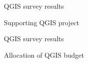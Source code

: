 \begin{frame}{QGIS survey results}
	\begin{block}{Supporting QGIS project}
	\end{block}
\end{frame}

\begin{frame}{QGIS survey results}
	\begin{block}{Allocation of QGIS budget}
	\end{block}
\end{frame}


